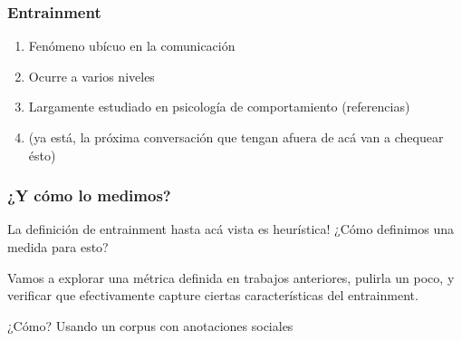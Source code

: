 \begin{frame}
  \frametitle{Entrainment}

  \begin{enumerate}
    \item Fenómeno ubícuo en la comunicación
    \item Ocurre a varios niveles
    \item Largamente estudiado en psicología de comportamiento (referencias)
    \item (ya está, la próxima conversación que tengan afuera de acá van a chequear ésto)
  \end{enumerate}
\end{frame}

\begin{frame}
  \frametitle{¿Y cómo lo medimos?}
  La definición de entrainment hasta acá vista es heurística! ¿Cómo definimos una medida para esto?

  Vamos a explorar una métrica definida en trabajos anteriores, pulirla un poco, y verificar que efectivamente capture ciertas características del entrainment.

  ¿Cómo? Usando un corpus con anotaciones sociales


\end{frame}
